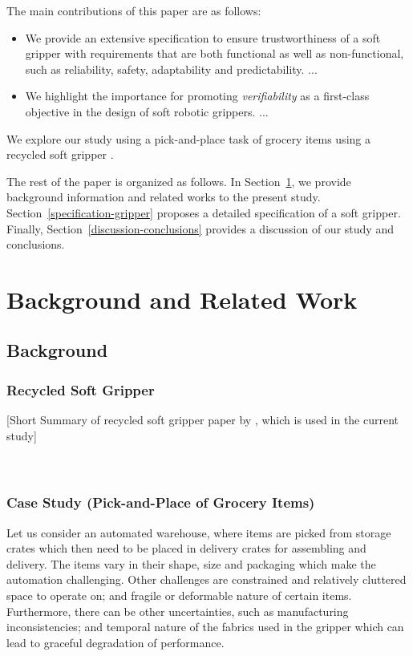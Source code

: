 \documentclass[lettersize,journal]{IEEEtran}
\begin{document}
The main contributions of this paper are as follows:
\begin{itemize}
	\item We provide an extensive specification to ensure trustworthiness of a soft gripper with requirements that are both functional as well as non-functional, such as reliability, safety, adaptability and predictability. ...
	\item We highlight the importance for promoting \emph{verifiability} as a first-class objective in the design of soft robotic grippers. ...
\end{itemize}
We explore our study using a pick-and-place task of grocery items using a recycled soft gripper \cite{Partridge2022}.

The rest of the paper is organized as follows. 
In Section~\ref{background-relatedwork}, we provide background information and related works to the present study. 
Section~\ref{specification-gripper} proposes a detailed specification of a soft gripper. 
Finally, Section~\ref{discussion-conclusions} provides a discussion of our study and conclusions. 

\section{Background and Related Work}\label{background-relatedwork}

\subsection{Background}\label{background}
\subsubsection{Recycled Soft Gripper}

[Short Summary of recycled soft gripper paper by \cite{Partridge2022}, which is used in the current study]
\\\\\\
\subsubsection{Case Study (Pick-and-Place of Grocery Items)}
Let us consider an automated warehouse, where items are picked from storage crates which then need to be placed in delivery crates for assembling and delivery. 
The items vary in their shape, size and packaging which make the automation challenging. 
Other challenges are constrained and relatively cluttered space to operate on; and fragile or deformable nature of certain items. 
Furthermore, there can be other uncertainties, such as manufacturing inconsistencies; and temporal nature of the fabrics used in the gripper which can lead to graceful degradation of performance. 
\end{document}
